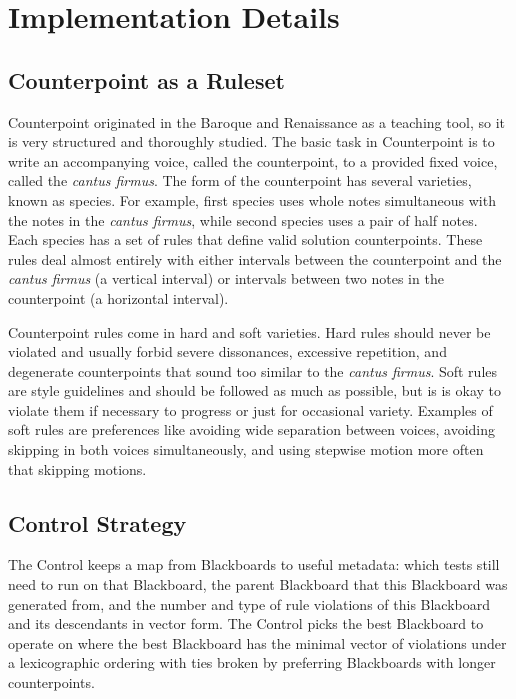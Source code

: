 \section{Implementation Details}

\subsection{Counterpoint as a Ruleset}
Counterpoint originated in the Baroque and Renaissance as a teaching tool, so it is very structured and thoroughly studied.
The basic task in Counterpoint is to write an accompanying voice, called the counterpoint, to a provided fixed voice, called the \emph{cantus firmus}.
The form of the counterpoint has several varieties, known as species. 
For example, first species uses whole notes simultaneous with the notes in the \emph{cantus firmus}, while second species uses a pair of half notes.
Each species has a set of rules that define valid solution counterpoints.
These rules deal almost entirely with either intervals between the counterpoint and the \emph{cantus firmus} (a vertical interval) or intervals between two notes in the counterpoint (a horizontal interval).

Counterpoint rules come in hard and soft varieties. 
Hard rules should never be violated and usually forbid severe dissonances, excessive repetition, and degenerate counterpoints that sound too similar to the \emph{cantus firmus}.
Soft rules are style guidelines and should be followed as much as possible, but is is okay to violate them if necessary to progress or just for occasional variety.
Examples of soft rules are preferences like avoiding wide separation between voices, avoiding skipping in both voices simultaneously, and using stepwise motion more often that skipping motions.

\subsection{Control Strategy}
The Control keeps a map from Blackboards to useful metadata: 
  which tests still need to run on that Blackboard,
  the parent Blackboard that this Blackboard was generated from,
  and the number and type of rule violations of this Blackboard and its descendants in vector form.
The Control picks the best Blackboard to operate on 
  where the best Blackboard has the minimal vector of violations under a lexicographic ordering 
  with ties broken by preferring Blackboards with longer counterpoints.

